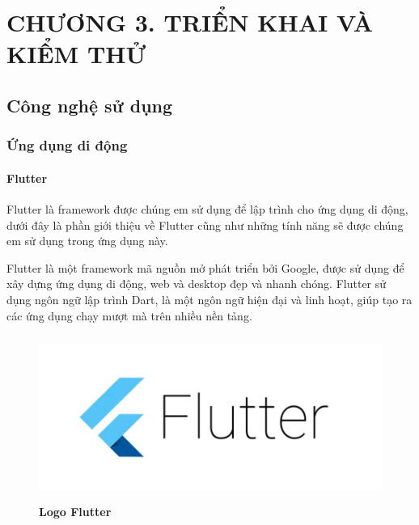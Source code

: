 
\section*{CHƯƠNG 3. TRIỂN KHAI VÀ KIỂM THỬ}
\setcounter{section}{3}
\setcounter{subsection}{0} %
\setcounter{table}{0} %
\setcounter{figure}{0} %

\subsection{Công nghệ sử dụng}
\subsubsection{Ứng dụng di động}

\paragraph{Flutter}
\mbox{}

Flutter là framework được chúng em sử dụng để lập trình cho ứng dụng di động, dưới đây là phần giới thiệu về Flutter cũng
như những tính năng sẽ được chúng em sử dụng trong ứng dụng này.

Flutter là một framework mã nguồn mở phát triển bởi Google, được sử dụng để xây dựng ứng dụng di động, web và desktop đẹp và nhanh chóng. Flutter sử dụng ngôn ngữ lập trình Dart, là một ngôn ngữ hiện đại và linh hoạt, giúp tạo ra các ứng dụng chạy mượt mà trên nhiều nền tảng.
\begin{figure}[H]
  \centering
  \includegraphics[width=12cm,height=5.4cm]{Images/flutter_cover.png}
  \caption[Logo Flutter]{\bfseries \fontsize{12pt}{0pt}
  \selectfont Logo Flutter}
  \label{flutter_cover} %
\end{figure}

